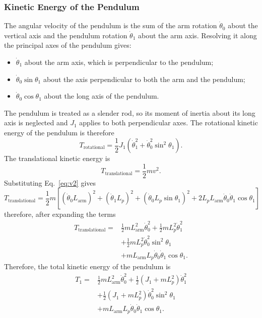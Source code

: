 \documentclass[a4paper,11pt]{article}
\newcommand{\La}{L_{\mathrm{arm}}}
\begin{document}
\subsubsection{Kinetic Energy of the Pendulum}
The angular velocity of the pendulum is the sum of the arm rotation $\dot\theta_0$ about the vertical axis and the pendulum rotation $\dot\theta_1$ about the arm axis. Resolving it along the principal axes of the pendulum gives:
\begin{itemize}
  \item $\dot\theta_1$ about the arm axis, which is perpendicular to the pendulum;
  \item $\dot\theta_0 \sin\theta_1$ about the axis perpendicular to both the arm and the pendulum;
  \item $\dot\theta_0 \cos\theta_1$ about the long axis of the pendulum.
\end{itemize}
The pendulum is treated as a slender rod, so its moment of inertia about its long axis is neglected and $J_1$ applies to both perpendicular axes. The rotational kinetic energy of the pendulum is therefore
\begin{equation}
  T_{\mathrm{rotational}} = \frac{1}{2} J_1 \left(\dot\theta_1^2 + \dot\theta_0^2 \sin^2\theta_1\right).
  \label{eq:Trot}
\end{equation}
The translational kinetic energy is
\begin{equation}
  T_{\mathrm{translational}} = \frac{1}{2} m v^2 .
\end{equation}
Substituting Eq.~\eqref{eq:v2} gives
\begin{equation}
  T_{\mathrm{translational}} = \frac{1}{2} m \left[\left(\dot\theta_0 \La\right)^2 + \left(\dot\theta_1 L_p\right)^2 + \left(\dot\theta_0 L_p \sin\theta_1\right)^2 + 2 L_p \La \dot\theta_0 \dot\theta_1 \cos\theta_1\right]
\end{equation}
therefore, after expanding the terms
\begin{equation}
\begin{aligned}
  T_{\mathrm{translational}} = {}& \frac{1}{2} m \La^2 \dot\theta_0^2 + \frac{1}{2} m L_p^2 \dot\theta_1^2\\
  & + \frac{1}{2} m L_p^2 \dot\theta_0^2 \sin^2\theta_1\\
  & + m \La L_p \dot\theta_0 \dot\theta_1 \cos\theta_1 .
\end{aligned}
\end{equation}
Therefore, the total kinetic energy of the pendulum is
\begin{equation}
\begin{aligned}
  T_1 = {}& \frac{1}{2} m \La^2 \dot\theta_0^2 + \frac{1}{2}\left(J_1 + m L_p^2\right)\dot\theta_1^2\\
  & + \frac{1}{2}\left(J_1 + m L_p^2\right)\dot\theta_0^2 \sin^2\theta_1\\
  & + m \La L_p \dot\theta_0 \dot\theta_1 \cos\theta_1 .
\end{aligned}
\label{eq:T1}
\end{equation}
\end{document}
